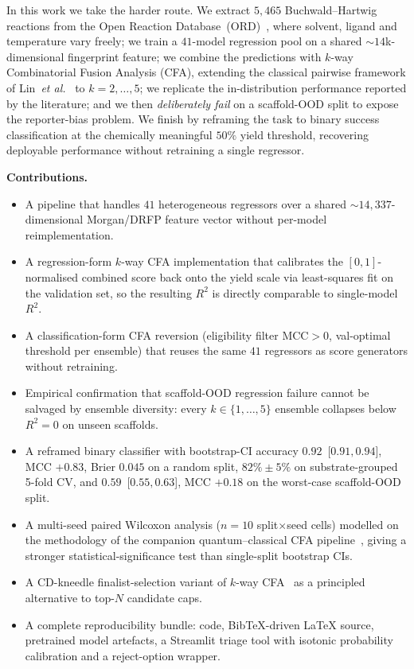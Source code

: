 \documentclass[conference]{IEEEtran}
\begin{document}
In this work we take the harder route. We extract $5{,}465$ Buchwald--Hartwig
reactions from the Open Reaction Database~(ORD)~\cite{Kearnes2021}, where
solvent, ligand and temperature vary freely; we train a $41$-model regression
pool on a shared $\sim$$14$k-dimensional fingerprint feature; we combine the
predictions with $k$-way Combinatorial Fusion Analysis (CFA), extending the
classical pairwise framework of Lin~\textit{et al.}~\cite{Lin2007} to
$k=2,\dots,5$; we replicate the in-distribution performance reported by the
literature; and we then \emph{deliberately fail} on a scaffold-OOD split to
expose the reporter-bias problem. We finish by reframing the task to binary
success classification at the chemically meaningful $50\%$ yield threshold,
recovering deployable performance without retraining a single regressor.

\medskip
\noindent\textbf{Contributions.}
\begin{itemize}
\item A pipeline that handles $41$ heterogeneous regressors over a shared
      $\sim$$14{,}337$-dimensional Morgan/DRFP feature vector without
      per-model reimplementation.
\item A regression-form $k$-way CFA implementation that calibrates the
      $[0,1]$-normalised combined score back onto the yield scale via
      least-squares fit on the validation set, so the resulting $R^{2}$ is
      directly comparable to single-model $R^{2}$.
\item A classification-form CFA reversion (eligibility filter
      $\mathrm{MCC}>0$, val-optimal threshold per ensemble) that reuses the
      same $41$ regressors as score generators without retraining.
\item Empirical confirmation that scaffold-OOD regression failure cannot be
      salvaged by ensemble diversity: every $k\in\{1,\dots,5\}$ ensemble
      collapses below $R^{2}=0$ on unseen scaffolds.
\item A reframed binary classifier with bootstrap-CI accuracy
      $0.92$~[$0.91,0.94$], MCC $+0.83$, Brier $0.045$ on a random split,
      $82\%\pm5\%$ on substrate-grouped 5-fold CV, and $0.59$~[$0.55,0.63$],
      MCC $+0.18$ on the worst-case scaffold-OOD split.
\item A multi-seed paired Wilcoxon analysis ($n\!=\!10$ split$\times$seed
      cells) modelled on the methodology of the companion
      quantum--classical CFA pipeline~\cite{Patten2026Quantum}, giving a
      stronger statistical-significance test than single-split bootstrap
      CIs.
\item A CD-kneedle finalist-selection variant of $k$-way
      CFA~\cite{Satopaa2011Knee,Patten2026Quantum} as a principled
      alternative to top-$N$ candidate caps.
\item A complete reproducibility bundle: code, BibTeX-driven LaTeX source,
      pretrained model artefacts, a Streamlit triage tool with isotonic
      probability calibration and a reject-option wrapper.
\end{itemize}
\end{document}
